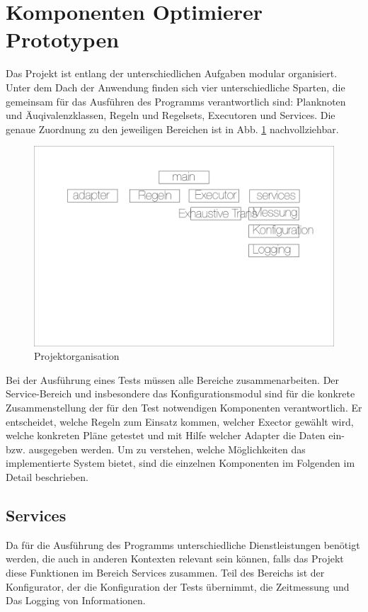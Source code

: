 \section{Komponenten Optimierer Prototypen}


Das Projekt ist entlang der unterschiedlichen Aufgaben modular organisiert. Unter dem Dach der Anwendung finden sich vier unterschiedliche Sparten, die gemeinsam für das Ausführen des Programms verantwortlich sind: Planknoten und Äuqivalenzklassen, Regeln und Regelsets, Executoren und Services. Die genaue Zuordnung zu den jeweiligen Bereichen ist in Abb. \ref{ProjectOrga} nachvollziehbar.


\begin{figure}[ht]
  \centering
  \includegraphics[width=\textwidth]{04_Implementierung/Matrix.png}
  \caption{Projektorganisation}
  \label{ProjectOrga}
\end{figure}

Bei der Ausführung eines Tests  müssen alle Bereiche zusammenarbeiten. Der Service-Bereich und insbesondere das Konfigurationsmodul sind für die konkrete Zusammenstellung der für den Test notwendigen Komponenten verantwortlich. Er entscheidet, welche Regeln zum Einsatz kommen, welcher Exector gewählt wird, welche konkreten Pläne getestet und mit Hilfe welcher Adapter die Daten ein-  bzw. ausgegeben werden. Um zu verstehen, welche Möglichkeiten das implementierte System bietet, sind die einzelnen Komponenten im Folgenden im Detail beschrieben.


\subsection{Services}
Da für die Ausführung des Programms unterschiedliche Dienstleistungen benötigt werden, die auch in anderen Kontexten relevant sein können, falls das Projekt diese Funktionen im Bereich Services zusammen. Teil des Bereichs ist der Konfigurator, der die Konfiguration der Tests übernimmt, die Zeitmessung und Das Logging von Informationen.

